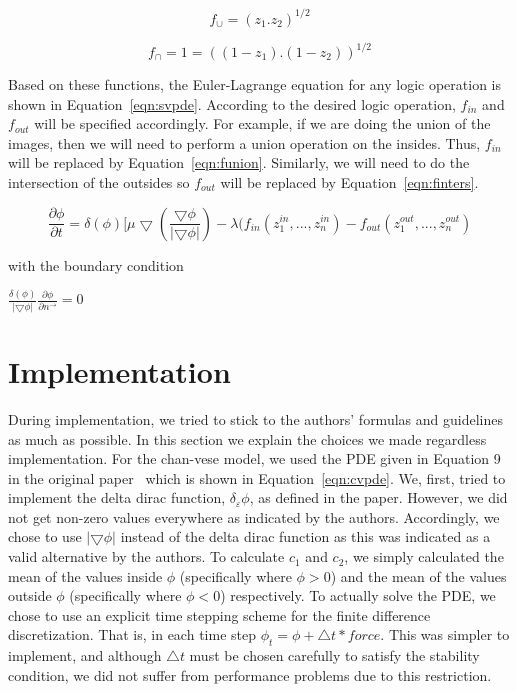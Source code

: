 \documentclass[10pt,twocolumn,letterpaper]{article}
\begin{document}
\begin{equation}
\label{eqn:funion}
f_{\cup} = (z_{1} . z_{2})^{1/2}
\end{equation}

\begin{equation}
\label{eqn:finters}
f_{\cap} = 1 = ((1 - z_{1}) .(1-  z_{2}))^{1/2}
\end{equation}

Based on these functions, the Euler-Lagrange equation for any logic operation is shown in Equation~\ref{eqn:svpde}. According to the desired logic operation,
$f_{in}$ and $f_{out}$ will be specified accordingly. For example, if we are doing the union of the images, then we will need to perform a union operation on
the insides. Thus, $f_{in}$ will be replaced by Equation~\ref{eqn:funion}. Similarly, we will need to do the intersection of the outsides so $f_{out}$ will be
replaced by Equation~\ref{eqn:finters}.

\begin{equation}
\label{eqn:svpde}
\frac{\partial{\phi}}{\partial{t}} = \delta(\phi)[\mu\bigtriangledown(\frac{\bigtriangledown \phi}{|\bigtriangledown \phi|})  - \lambda(f_{in}(z_{1}^{in}, ...,
z_{n}^{in}) - f_{out}(z_{1}^{out}, ..., z_{n}^{out})
\end{equation}

with the boundary condition

$\frac{\delta(\phi)}{|\bigtriangledown\phi|}\frac{\partial\phi}{\partial n^{\rightarrow}} = 0$

\section{Implementation}
\label{sec:implementation}

During implementation, we tried to stick to the authors' formulas and guidelines as much as possible. In this section we explain the choices we made regardless
implementation. For the chan-vese model, we used the PDE given in Equation 9 in the original paper~\cite{chan2001active} which is shown in
Equation~\ref{eqn:cvpde}.  We, first, tried to implement the delta dirac function, $\delta_{\varepsilon}\phi$, as defined in the paper. However, we did not
get non-zero values everywhere as indicated by the authors. Accordingly, we chose to use $|\bigtriangledown\phi|$ instead of the delta dirac function as this
was indicated as a valid alternative by the authors. To calculate $c_{1}$ and $c_{2}$, we simply calculated the mean of the values inside $\phi$ (specifically
where $\phi > 0$) and the mean of the values outside $\phi$ (specifically where $\phi < 0$) respectively. To actually solve the PDE, we chose to use an explicit
time stepping scheme for the finite difference discretization. That is, in each time step $\phi_{t} = \phi + \triangle t*force$. This was simpler to implement,
and although $\triangle t$ must be chosen carefully to satisfy the stability condition, we did not suffer from performance problems due to this restriction.
\end{document}
